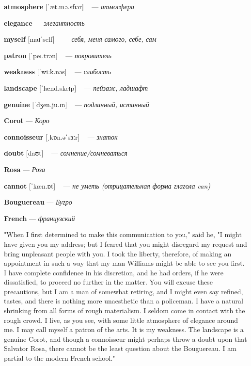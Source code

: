 \documentclass[a4paper,oneside,12pt]{amsart}
\begin{document}
{{\bf atmosphere } [ˈæt.mə.sfɪər] ~ --- \emph{ атмосфера }

{\bf elegance } --- \emph{ элегантность }

{\bf myself } [maɪˈself] ~ --- \emph{ себя, меня самого, себе, сам }

{\bf patron } [ˈpeɪ.trən] ~ --- \emph{ покровитель }

{\bf weakness } [ˈwiːk.nəs] ~ --- \emph{ слабость }

{\bf landscape } [ˈlænd.skeɪp] ~ --- \emph{ пейзаж, ладшафт }

{\bf genuine } [ˈdʒen.ju.ɪn] ~ --- \emph{ подлинный, истинный }

{\bf Corot } --- \emph{ Коро }

{\bf connoisseur } [ˌkɒn.əˈsɜːr] ~ --- \emph{ знаток }

{\bf doubt } [daʊt] ~ --- \emph{ сомнение/сомневаться }

{\bf Rosa } --- \emph{ Роза }

{\bf cannot } [ˈkæn.ɒt] ~ --- \emph{ не уметь (отрицательная форма глагола can) }

{\bf Bouguereau } --- \emph{ Бугро }

{\bf French } --- \emph{ французский }

} \vspace{6mm} {\Large 

 
"When I first determined to make this communication to you," said he, "I might have given you my address; but I feared that you might disregard my request and bring unpleasant people with you. I took the liberty, therefore, of making an appointment in such a way that my man Williams might be able to see you first. I have complete confidence in his discretion, and he had orders, if he were dissatisfied, to proceed no further in the matter. You will excuse these precautions, but I am a man of somewhat retiring, and I might even say refined, tastes, and there is nothing more unaesthetic than a policeman. I have a natural shrinking from all forms of rough materialism. I seldom come in contact with the rough crowd. I live, as you see, with some little atmosphere of elegance around me. I may call myself a patron of the arts. It is my weakness. The landscape is a genuine Corot, and though a connoisseur might perhaps throw a doubt upon that Salvator Rosa, there cannot be the least question about the Bouguereau. I am partial to the modern French school."
\\ } 
\end{document}
